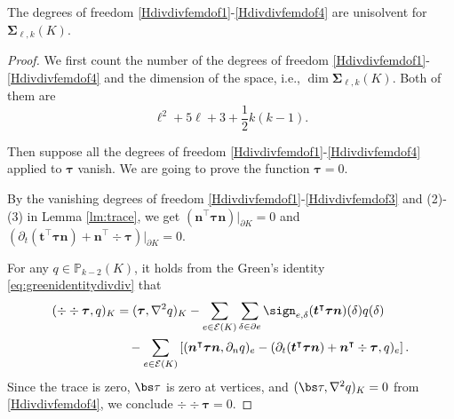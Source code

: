 \begin{lemma}\label{lem:unisovlenHdivdivfem}
The degrees of freedom \eqref{Hdivdivfemdof1}-\eqref{Hdivdivfemdof4} are unisolvent for $\boldsymbol \Sigma_{\ell,k}(K)$.
\end{lemma}
\begin{proof}
We first count the number of the degrees of freedom \eqref{Hdivdivfemdof1}-\eqref{Hdivdivfemdof4}  and the dimension of the space, i.e., $\dim\boldsymbol \Sigma_{\ell,k}(K)$.
Both of them are $$\ell^2+5\ell+3+\frac{1}{2}k(k-1).$$





Then suppose all the degrees of freedom \eqref{Hdivdivfemdof1}-\eqref{Hdivdivfemdof4} applied to $\boldsymbol \tau$ vanish. We are going to prove the function $\boldsymbol \tau = 0$. 

\medskip

 By the vanishing degrees of freedom \eqref{Hdivdivfemdof1}-\eqref{Hdivdivfemdof3} and (2)-(3) in Lemma \ref{lm:trace}, we get $(\boldsymbol n^{\intercal}\boldsymbol \tau\boldsymbol n)|_{\partial K}=0$ and $(\partial_{t}(\boldsymbol  t^{\intercal}\boldsymbol \tau\boldsymbol  n)+\boldsymbol  n^{\intercal}\div\boldsymbol \tau)|_{\partial K}=0$.

\medskip

For any $q\in\mathbb P_{k-2}(K)$, it holds from the Green's identity \eqref{eq:greenidentitydivdiv} that
\begin{align*}
(\div\div\boldsymbol \tau, q)_K&=(\boldsymbol \tau, \nabla^2q)_K-\sum_{e\in\mathcal E(K)}\sum_{\delta\in\partial e}\sign_{e,\delta}(\boldsymbol  t^{\intercal}\boldsymbol \tau\boldsymbol  n)(\delta)q(\delta) \\
&\quad-\sum_{e\in\mathcal E(K)}\left[(\boldsymbol  n^{\intercal}\boldsymbol \tau\boldsymbol  n, \partial_n q)_{e}-(\partial_{t}(\boldsymbol  t^{\intercal}\boldsymbol \tau\boldsymbol  n)+\boldsymbol  n^{\intercal}\div\boldsymbol \tau,  q)_{e}\right].
\end{align*}
Since the trace is zero, $\bs \tau$ is zero at vertices, and $(\bs \tau, \nabla^2 q)_K = 0$ from \eqref{Hdivdivfemdof4},  we conclude $\div\div\boldsymbol \tau=0$. 


\end{proof}
